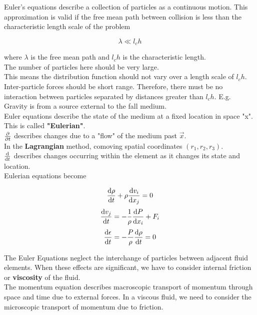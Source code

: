 \documentclass[]{article}
\begin{document}

Euler's equations describe a collection of particles as a continuous motion. This approximation is valid if the free mean path between collision is less than the characteristic length scale of the problem

\[\lambda \ll l_ch\]

where $\lambda$ is the free mean path and $l_ch$ is the characteristic length. \\

The number of particles here should be very large.\\

This means the distribution function should not vary over a length scale of $l_ch$.\\

Inter-particle forces should be short range. Therefore, there must be no interaction between particles separated by distances greater than $l_ch$. E.g. Gravity is from a source external to the fall medium.\\

Euler equations describe the state of the medium at a fixed location in space "x". This is called \textbf{"Eulerian"}. \\

$\pdv{}{t} $ describes changes due to a "flow" of the medium past $\vec{x}$.\\

In the \textbf{Lagrangian} method, comoving spatial coordinates $(r_1, r_2, r_3)$.\\

$\dv{}{t} $ describes changes occurring within the element as it changes its state and location.\\

Eulerian equations become


\[\dv{\rho}{t} + \rho\dv{v_i}{x_j} = 0\]
\[\dv{v_j}{t} = -\frac{1}{\rho}\dv{P}{x_i} + F_i \]
\[\dv{\epsilon}{t} = -\frac{P}{\rho}\dv{\rho}{t} = 0\]

The Euler Equations neglect the interchange of particles between adjacent fluid elements. When these effects are significant, we have to consider internal friction or \textbf{viscosity} of the fluid.\\

The momentum equation describes macroscopic transport of momentum through space and time due to external forces. In a viscous fluid, we need to consider the microscopic transport of momentum due to friction.\\
\end{document}
